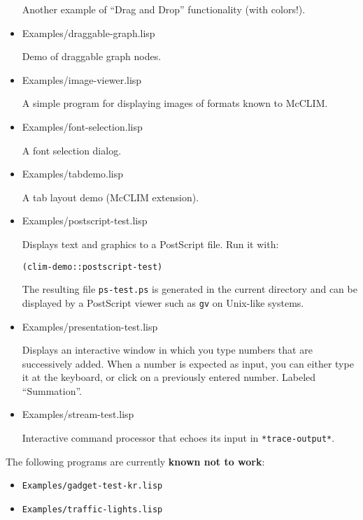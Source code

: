 \begin{itemize}
  Another example of ``Drag and Drop'' functionality (with colors!).

\item Examples/draggable-graph.lisp

  Demo of draggable graph nodes.

\item Examples/image-viewer.lisp

  A simple program for displaying images of formats known to McCLIM.

\item Examples/font-selection.lisp

  A font selection dialog.

\item Examples/tabdemo.lisp

  A tab layout demo (McCLIM extension).

\item Examples/postscript-test.lisp

  Displays text and graphics to a PostScript file.  Run it with:

\begin{verbatim}
(clim-demo::postscript-test)
\end{verbatim}

  The resulting file \texttt{ps-test.ps} is generated in the current
  directory and can be displayed by a PostScript viewer such as
  \texttt{gv} on Unix-like systems.

\item Examples/presentation-test.lisp

  Displays an interactive window in which you type numbers that are
  successively added.  When a number is expected as input, you can
  either type it at the keyboard, or click on a previously entered
  number. Labeled ``Summation''.

\item Examples/stream-test.lisp

  Interactive command processor that echoes its input in
  \texttt{*trace-output*}.

\end{itemize}

The following programs are currently \textbf{known not to work}:
\begin{itemize}
\item
 \texttt{Examples/gadget-test-kr.lisp}
\item
 \texttt{Examples/traffic-lights.lisp}
\end{itemize}

